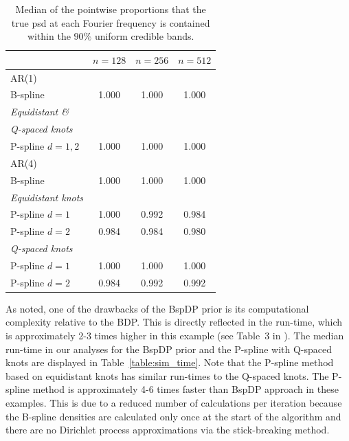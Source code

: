 \documentclass[twocolumn,final]{svjour3}
\begin{document}
\begin{table}
	\centering
		\begin{tabular}{lccc}
			\toprule
			& $n=128$ & $n=256$ & $n=512$ \\ \hline
			AR(1)     &  &  &  \\ 
			B-spline &  1.000 & 1.000 & 1.000 \\
			\textit{Equidistant \&}& & &   \\
			\textit{Q-spaced knots}& & &   \\
			\hspace{0.5em}P-spline $d=1,2$ & 1.000 & 1.000 & 1.000  \\ \hline	 		      
			AR(4)     &  &  &  \\ 
			B-spline &  1.000 & 1.000 & 1.000 \\
			\textit{Equidistant knots}& & &   \\
			\hspace{0.5em}P-spline $d=1$ &  1.000 & 0.992 & 0.984 \\
			\hspace{0.5em}P-spline $d=2$&  0.984 & 0.984 & 0.980 \\
			\textit{Q-spaced knots}& & &   \\	
			\hspace{0.5em}P-spline $d=1$ & 1.000 & 1.000 & 1.000 \\
			\hspace{0.5em}P-spline $d=2$ & 0.984 & 0.992 & 0.992\\	
			\bottomrule
		\end{tabular}
	\caption{Median of the pointwise  proportions that the true psd at each Fourier frequency is contained within the $90\%$ uniform credible bands.}
	\label{table:sim_covPbb_median}
\end{table}



As \cite{Edwards2019} noted, one of the drawbacks of the BspDP prior  is its computational complexity relative to the BDP.  This is directly reflected in the run-time, which is approximately 2-3 times higher in this example (see Table~3 in \cite{Edwards2019}).  The median run-time in our analyses for the BspDP prior and the P-spline with Q-spaced knots are displayed in Table~\ref{table:sim_time}.  Note that the P-spline method based on equidistant knots has similar run-times to the Q-spaced knots.  The P-spline method is approximately 4-6 times faster than BspDP approach in these examples.  This is due to a reduced number of calculations  per iteration because the B-spline densities are calculated only  once at the start of the algorithm and there are no Dirichlet process approximations via the stick-breaking method.  
\end{document}
